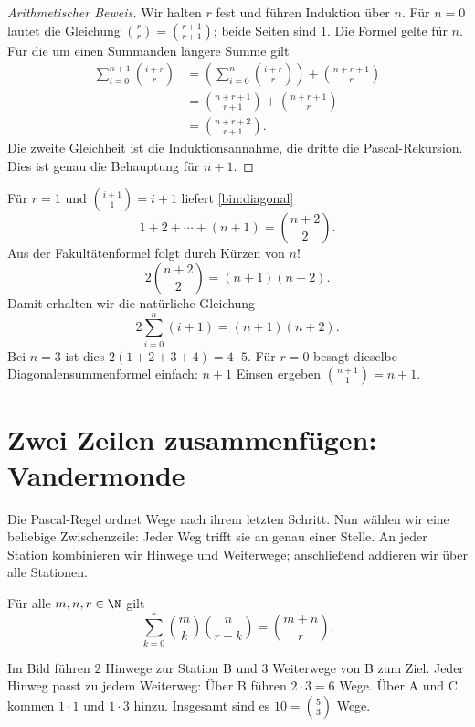 \begin{proof}[Arithmetischer Beweis]
Wir halten $r$ fest und führen Induktion über $n$.
Für $n=0$ lautet die Gleichung
$\binom rr=\binom{r+1}{r+1}$; beide Seiten sind $1$.
Die Formel gelte für $n$. Für die um einen Summanden längere Summe gilt
\[
 \begin{aligned}
 \sum_{i=0}^{n+1}\binom{i+r}r
 &=\left(\sum_{i=0}^n\binom{i+r}r\right)+\binom{n+r+1}r\\
 &=\binom{n+r+1}{r+1}+\binom{n+r+1}r\\
 &=\binom{n+r+2}{r+1}.
 \end{aligned}
\]
Die zweite Gleichheit ist die Induktionsannahme, die dritte die
Pascal-Rekursion. Dies ist genau die Behauptung für $n+1$.
\end{proof}

\begin{beispiel}
Für $r=1$ und $\binom{i+1}1=i+1$ liefert \eqref{bin:diagonal}
\[
 1+2+\cdots+(n+1)=\binom{n+2}2.
\]
Aus der Fakultätenformel folgt durch Kürzen von $n!$
\[
 2\binom{n+2}2=(n+1)(n+2).
\]
Damit erhalten wir die natürliche Gleichung
\[
 2\sum_{i=0}^n(i+1)=(n+1)(n+2).
\]
Bei $n=3$ ist dies $2(1+2+3+4)=4\cdot5$.
Für $r=0$ besagt dieselbe Diagonalensummenformel einfach:
$n+1$ Einsen ergeben $\binom{n+1}1=n+1$.
\end{beispiel}

\section{Zwei Zeilen zusammenfügen: Vandermonde}
\label{bin:vandermonde-section}

Die Pascal-Regel ordnet Wege nach ihrem letzten Schritt.
Nun wählen wir eine beliebige Zwischenzeile: Jeder Weg trifft sie an
genau einer Stelle. An jeder Station kombinieren wir Hinwege und
Weiterwege; anschließend addieren wir über alle Stationen.

\begin{satz}
Für alle $m,n,r\in\N$ gilt
\begin{equation}\tag{V}\label{bin:vandermonde}
 \boxed{\displaystyle
 \sum_{k=0}^r\binom mk\binom n{r-k}=\binom{m+n}r.}
\end{equation}
\end{satz}

\begin{center}\PascalWegeVandermonde\end{center}
Im Bild führen $2$ Hinwege zur Station B und $3$ Weiterwege von B
zum Ziel. Jeder Hinweg passt zu jedem Weiterweg: Über B führen
$2\cdot3=6$ Wege. Über A und C kommen $1\cdot1$ und $1\cdot3$ hinzu.
Insgesamt sind es $10=\binom53$ Wege.

